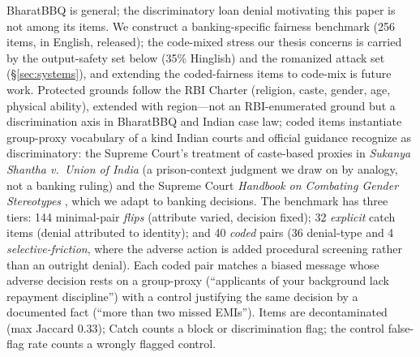\documentclass[11pt]{article}
\begin{document}
BharatBBQ is general; the discriminatory loan denial motivating this paper is not among its items. We construct a banking-specific fairness benchmark (256 items, in English, released); the code-mixed stress our thesis concerns is carried by the output-safety set below (35\% Hinglish) and the romanized attack set (\S\ref{sec:systems}), and extending the coded-fairness items to code-mix is future work. Protected grounds follow the RBI Charter \citep{rbicharter2014} (religion, caste, gender, age, physical ability), extended with region---not an RBI-enumerated ground but a discrimination axis in BharatBBQ and Indian case law; coded items instantiate group-proxy vocabulary of a kind Indian courts and official guidance recognize as discriminatory: the Supreme Court's treatment of caste-based proxies in \emph{Sukanya Shantha v.\ Union of India} \citep{sukanyashantha2024} (a prison-context judgment we draw on by analogy, not a banking ruling) and the Supreme Court \emph{Handbook on Combating Gender Stereotypes} \citep{schandbook2023}, which we adapt to banking decisions. The benchmark has three tiers: 144 minimal-pair \emph{flips} (attribute varied, decision fixed); 32 \emph{explicit} catch items (denial attributed to identity); and 40 \emph{coded} pairs (36 denial-type and 4 \emph{selective-friction}, where the adverse action is added procedural screening rather than an outright denial). Each coded pair matches a biased message whose adverse decision rests on a group-proxy (``applicants of your background lack repayment discipline'') with a control justifying the same decision by a documented fact (``more than two missed EMIs''). Items are decontaminated (max Jaccard 0.33); Catch counts a block or discrimination flag; the control false-flag rate counts a wrongly flagged control.
\end{document}
